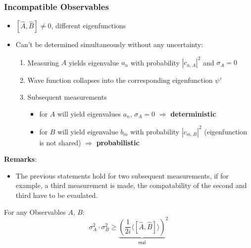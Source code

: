 \subsubsection{Incompatible Observables}

\begin{itemize}
    \item $[\widehat{A}, \widehat{B}] \neq 0$, different eigenfunctions
    \item Can't be determined simultaneously without any uncertainty:
          \begin{enumerate}
              \item Measuring $A$ yields eigenvalue $a_n$ with probability $|c_{n,A}|^2$ and $\sigma_A=0$
              \item Wave function collapses into the corresponding eigenfunction $\psi'$
              \item Subsequent measurements
                    \begin{itemize}
                        \item for $A$ will yield eigenvalues $a_n$, $\sigma_A=0$ $\Rightarrow$ \textbf{deterministic}
                        \item for $B$ will yield eigenvalue $b_m$ with probability $|c_{m,B}|^2$ (eigenfunction is not shared) $\Rightarrow$ \textbf{probabilistic}
                    \end{itemize}
          \end{enumerate}
\end{itemize}

\textbf{Remarks}:
\begin{itemize}
    \item The previous statements hold for two subsequent measurements, if for example, a third measurement is made, the compatability of the second and third have to be evaulated.
\end{itemize}

\newpar{}

For any Observables $A$, $B$:
\begin{equation*}
    \sigma_A^2\cdot\sigma_B^2\geqslant{\underbrace{\left(\frac1{2i}\langle[\hat{A},\hat{B}]\rangle\right)}_{\textsf{real}}}^2
\end{equation*}

